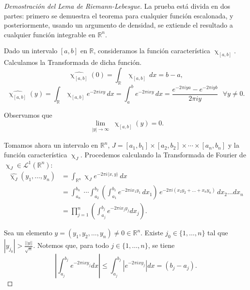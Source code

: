 \begin{proof}[Demostración del Lema de Riemann-Lebesgue] La prueba está divida en dos partes: primero se demuestra el teorema para cualquier función escalonada, y posteriormente, usando un argumento de densidad, se extiende el resultado a cualquier función integrable en $\mathbb{R}^n$.
\vspace{0.1cm}



\noindent Dado un intervalo $\left[a,b\right]$  en $\mathbb{R}$, consideramos la función característica $\upchi_{\left[a,b\right]}$. Calculamos la Transformada de dicha función.
\begin{equation}
\widehat{\upchi_{\left[a,b\right]}}(0) = \int_{\mathbb{R}} \upchi_{\left[a,b\right]}\, dx = b-a,
\end{equation}
\begin{equation}\label{eq:caract}
\widehat{\upchi_{\left[a,b\right]}}(y) = \int_{\mathbb{R}} \upchi_{\left[a,b\right]}e^{-2\pi i xy} \, dx =\int_{a}^{b} e^{-2\pi i  x y } \, dx = \frac{e^{-2 \pi i y a}-e^{-2 \pi i y b}}{2 \pi i y} \, \, \, \,\forall y \neq 0 .
\end{equation}

\noindent Observamos que
\begin{equation}   
\underset{\substack{|y| \rightarrow \infty}}{\lim}\widehat{\upchi_{\left[a,b\right]}}(y)=0.
\end{equation}


\noindent Tomamos ahora un  intervalo en $\mathbb{R}^n$, $ J = [a_1, b_1] \times [a_2, b_2] \times \cdots \times [a_n, b_n]$ y  la función  característica $\upchi_{J}$. Procedemos calculando la Transformada de Fourier de $\upchi_{J}\in \mathscr{L}^1(\mathbb{R}^n)$:
\begin{align}
    \widehat{\upchi_{J}}(y_1, \ldots, y_n) &= \int_{\mathbb{R}^n} \upchi_{J} e^{-2\pi i \langle x, y \rangle} \, dx \nonumber \\
    &= \int_{a_n}^{b_n}\ \cdots \int_{a_2}^{b_2}\left( \int_{a_1}^{b_1}  e^{-2\pi i x_1y_1 } \, dx_1\right) \, e^{-2\pi i (x_2y_2 + \ldots + x_ny_n) } \, dx_2 \ldots dx_n \\ &= \prod_{j=1}^{n}\left( \int_{a_j}^{b_j}e^{-2 \pi i x_jy_j} dx_j\right) .
\end{align}



\noindent Sea  un elemento $y = (y_1, y_2, \ldots ,y_n)\neq 0 \in \mathbb{R}^n $. Existe $j_0 \in \{1, \ldots, n\}$ tal que $|y_{j_0}| > \frac{||y||}{\sqrt{n}}$. 
Notemos que, para todo $j \in \{1, \ldots, n\}$, se tiene 
\begin{equation}
    \left| \int_{a_j}^{b_j} e^{-2 \pi i x y_j} dx \right| \leq  \int_{a_j}^{b_j} \left| e^{-2 \pi i x y_j} \right| dx  = (b_j-a_j).
\end{equation}


\end{proof}
